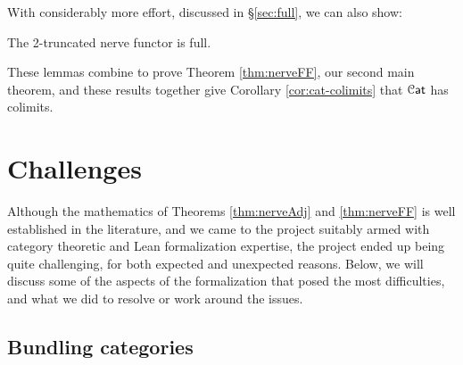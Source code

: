 \documentclass[a4paper,UKenglish,cleveref, autoref, thm-restate]{lipics-v2021}
\newcommand{\cat}[1]{\textup{\textsf{#1}}}%
\newcommand{\1}{\mathbbe{1}}
\newcommand{\2}{\mathbbe{2}}
\newcommand{\3}{\mathbbe{3}}
\newcommand{\Cat}{\mathcal{C}\cat{at}}
\newcommand{\rightharpoons}{\mathrel{\mathrlap{\raisebox{0.7pt}{\ensuremath{\rightharpoonup}}}{\raisebox{-0.7pt}{\ensuremath{\rightharpoondown}}}}}
\newcommand{\fixme}[1]{}
\newcommand{\libmathlib}{\href{https://github.com/leanprover-community/mathlib}{\textsf{mathlib}}}
\newcommand{\cdoc}[2][]{\href{https://leanprover-community.github.io/mathlib4_docs/find/?pattern=CategoryTheory.#1#2\#doc}{\texttt{#2}}}
\newcommand{\cdocTwo}[3][]{\href{https://leanprover-community.github.io/mathlib4_docs/find/?pattern=CategoryTheory.#1#2\%E2\%82\%82#3\#doc}{\texttt{#2${}_2$#3}}}
\begin{document}
With considerably more effort, discussed in \S\ref{sec:full}, we can also show:

\begin{lemma}[\cdocTwo{nerveFunctor}{.full}]\label{lem:nerve2-full}
The 2-truncated nerve functor is full.
\end{lemma}

These lemmas combine to prove Theorem \ref{thm:nerveFF}, our second main theorem, and these results together give Corollary \ref{cor:cat-colimits} that $\Cat$ has colimits.

\section{Challenges}\label{sec:challenges}

Although the mathematics of Theorems \ref{thm:nerveAdj} and \ref{thm:nerveFF} is well established in the literature, and we came to the project suitably armed with category theoretic and Lean formalization expertise, the project ended up being quite challenging, for both expected and unexpected reasons. Below, we will discuss some of the aspects of the formalization that posed the most difficulties, and what we did to resolve or work around the issues.

\subsection{Bundling categories}\label{sec:expected-challenges}


\end{document}
